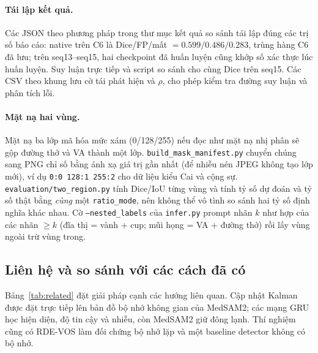 \documentclass[a4paper,12pt]{report}
\begin{document}
\paragraph{Tái lập kết quả.} Các JSON theo phương pháp trong thư mục kết quả so sánh tái lập đúng các trị số báo cáo: native trên C6 là Dice/FP/mất $=0.599/0.486/0.283$, trùng hàng C6 đã lưu; trên seq13--seq15, hai checkpoint đã huấn luyện cũng khớp số xác thực lúc huấn luyện. Suy luận trực tiếp và script so sánh cho cùng Dice trên seq15. Các CSV theo khung lưu cờ tái phát hiện và $\rho$, cho phép kiểm tra đường suy luận và phân tích lỗi.

\paragraph{Mặt nạ hai vùng.} Mặt nạ ba lớp mã hóa mức xám (0/128/255) nếu đọc như mặt nạ nhị phân sẽ gộp đường thở và VA thành một lớp. \texttt{build\_mask\_manifest.py} chuyển chúng sang PNG chỉ số bằng ánh xạ giá trị gần nhất (để nhiễu nén JPEG không tạo lớp mới), ví dụ \texttt{0:0 128:1 255:2} cho dữ liệu kiểu Cai và cộng sự. \texttt{evaluation/two\_region.py} tính Dice/IoU từng vùng và tính tỷ số dự đoán và tỷ số thật bằng \emph{cùng} một \texttt{ratio\_mode}, nên không thể vô tình so sánh hai tỷ số định nghĩa khác nhau. Cờ \texttt{--nested\_labels} của \texttt{infer.py} prompt nhãn $k$ như hợp của các nhãn $\geq k$ (đĩa thị = vành + cup; mũi họng = VA + đường thở) rồi lấy vùng ngoài trừ vùng trong.

\subsection{Liên hệ và so sánh với các cách đã có}

Bảng~\ref{tab:related} đặt giải pháp cạnh các hướng liên quan. Cập nhật Kalman được đặt trực tiếp lên bản đồ bộ nhớ không gian của MedSAM2; các mạng GRU học hiện diện, độ tin cậy và nhiễu, còn MedSAM2 giữ đông lạnh. Thí nghiệm cũng có RDE-VOS làm đối chứng bộ nhớ lặp và một baseline detector không có bộ nhớ.
\end{document}
